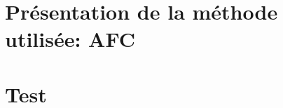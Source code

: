 \documentclass[a4paper,notitlepage]{article}
\begin{document}


\newpage
\thispagestyle{empty}

\tableofcontents

\listoffigures

\newpage
\setcounter{page}{1}

\section{Présentation de la méthode utilisée: AFC}



\section{Test}

\citep{dataset, prince, scipy, matplotlib}


\begin{flushleft}

\end{flushleft}
\end{document}
